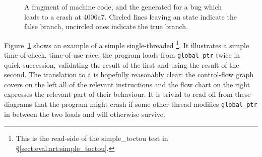 \begin{figure}
\begin{subfloat}
\begin{minipage}{30mm}
    \end{minipage}
    \caption{\STateMachine}
  \end{subfloat}
  \label{fig:intro:single_threaded_machine}
  \caption{A fragment of machine code, and the {\StateMachine}
    generated for a bug which leads to a crash at 4006a7.  Circled
    lines leaving an  state indicate the false branch,
    uncircled ones indicate the true branch.}
\end{figure}

Figure~\ref{fig:intro:single_threaded_machine} shows an example of a
simple single-threaded \StateMachine\footnote{This is the read-side of
  the simple\_toctou test in \S\ref{sect:eval:art:simple_toctou}.}.
It illustrates a simple time-of-check, time-of-use race: the program
loads from \verb|global_ptr| twice in quick succession, validating the
result of the first and using the result of the second.  The
translation to a {\StateMachine} is hopefully reasonably clear: the
control-flow graph covers on the left all of the relevant instructions
and the flow chart on the right expresses the relevant part of their
behaviour.  It is trivial to read off from these diagrams that the
program might crash if some other thread modifies \verb|global_ptr| in
between the two loads and will otherwise survive.

